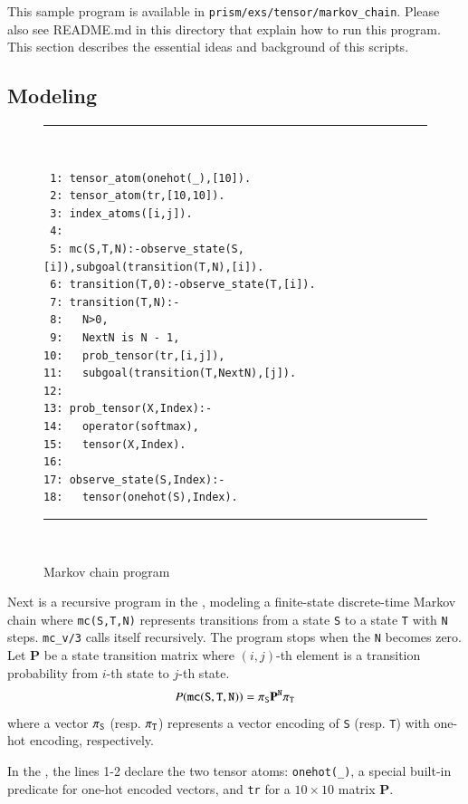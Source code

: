 \documentclass[a4paper]{report}
\newcommand{\mvec}[1]{\mathbf{#1}}
\newcommand{\mmat}[1]{\mathbf{#1}}
\begin{document}
This sample program is available in \verb|prism/exs/tensor/markov_chain|.
Please also see README.md in this directory that explain how to run this program.
This section describes the essential ideas and background of this scripts. 

\subsection*{Modeling}

\begin{figure}[tb]
	\rule{0.85\textwidth}{0.10mm}\\ [-1em]
	\begin{verbatim}
 1: tensor_atom(onehot(_),[10]).
 2: tensor_atom(tr,[10,10]).
 3: index_atoms([i,j]).
 4: 
 5: mc(S,T,N):-observe_state(S,[i]),subgoal(transition(T,N),[i]).
 6: transition(T,0):-observe_state(T,[i]).
 7: transition(T,N):-
 8:   N>0,
 9:   NextN is N - 1,
10:   prob_tensor(tr,[i,j]),
11:   subgoal(transition(T,NextN),[j]).
12: 
13: prob_tensor(X,Index):-
14:   operator(softmax),
15:   tensor(X,Index).
16: 
17: observe_state(S,Index):-
18:   tensor(onehot(S),Index).
	\end{verbatim}
	\rule{0.85\textwidth}{0.10mm}\\ [-1em]
	\caption{Markov chain program}
	\label{fig:mc}
\end{figure}

Next  is a  recursive  program in  the  , modeling  a
finite-state  discrete-time   Markov  chain  where   {\tt  mc(S,T,N)}
represents transitions  from a state {\tt  S} to a state  {\tt T} with
{\tt N} steps.   {\tt mc\_v/3} calls itself  recursively.  The program
stops when the {\tt N} becomes zero.
%
Let $\mmat{P}$ be  a state transition matrix  where $(i,j)$-th element
is a transition probability from $i$-th state to $j$-th state.
%
\begin{equation}
P({\tt mc(S,T,N)} )=\mvec{\pi}_{\tt S}\mmat{P}^{\tt N}\mvec{\pi}_{\tt T}
\label{eq:mc}
\end{equation}
%
where  a vector  $\mvec{\pi}_{\tt  S}$  (resp.  $\mvec{\pi}_{\tt  T}$)
represents a vector  encoding of {\tt S} (resp. {\tt  T}) with one-hot
encoding, respectively.


In the , the lines 1-2 declare the two tensor atoms:
{\tt  onehot(\_)}, a  special built-in  predicate for  one-hot encoded
vectors, and {\tt tr} for a $10 \times 10$ matrix $\mmat{P}$. 
\end{document}
